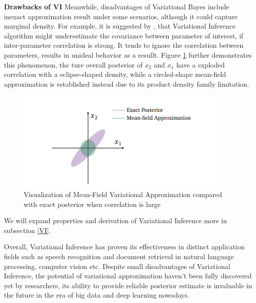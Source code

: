 \textbf{Drawbacks of VI}
Meanwhile, disadvantages of Variational Bayes include inexact approximation result under some scenarios, although it could capture marginal density. For example, it is suggested by \cite{blei_kucukelbir_mcauliffe_2017},
that Variational Inference algorithm might underestimate the covariance between parameter of interest, if inter-parameter correlation is strong. It tends to ignore the correlation between parameters, results in unideal behavior as a resullt. Figure \ref{fig:VIdemo}
further demonstrates this phenomenon, the ture overall posterior of $x_2$ and $x_1$ have a exploded correlation with a eclipse-shaped density, while a circled-shape mean-field approximation is established instead due to its product density family limitation.
\begin{figure}
	\includegraphics[width=\linewidth]{VIdemo}
	\caption{Visualization of Mean-Field Variational Approximation compared with exact posterior when correlation is large}
	\label{fig:VIdemo}
\end{figure}
We will expand properties and derivation of Variational Inference more in subsection \ref{VI}.

Overall, Variational Inference has proven its effectiveness in distinct application fields such as speech recognition and document retrieval in natural language processing, computer vision etc. Despite small disadvantages of Variational Inference, the potential of variational approximation haven't been fully discovered yet by researchers, its ability to provide reliable posterior estimate is invaluable in the future in the era of big data and deep learning nowadays.

